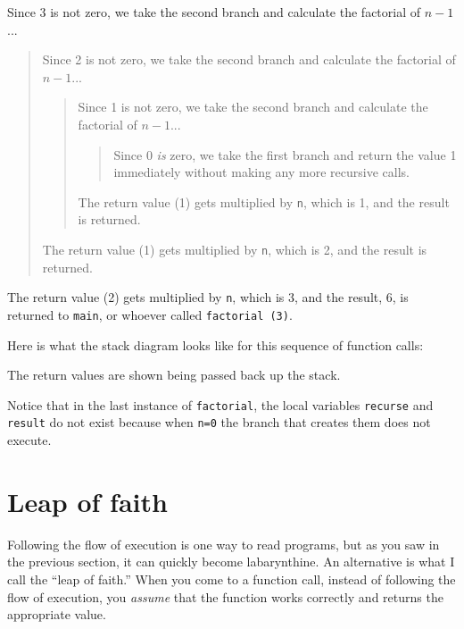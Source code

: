 Since 3 is not zero, we take the second branch and calculate
the factorial of $n-1$...

\begin{quote}
Since 2 is not zero, we take the second branch and calculate
the factorial of $n-1$...

\begin{quote}
Since 1 is not zero, we take the second branch and calculate
the factorial of $n-1$...

\begin{quote}
Since 0 {\em is} zero, we take the first branch and return
the value 1 immediately without making any more recursive
calls.

\end{quote}

The return value (1) gets multiplied by {\tt n}, which is 1,
and the result is returned.

\end{quote}

The return value (1) gets multiplied by {\tt n}, which is 2,
and the result is returned.

\end{quote}

\noindent The return value (2) gets multiplied by {\tt n}, which is 3,
and the result, 6, is returned to {\tt main}, or whoever
called {\tt factorial (3)}.


Here is what the stack diagram looks like for this sequence of
function calls:

\vspace{0.1in}
\centerline{}
\vspace{0.1in}
%
The return values are shown being passed back up the stack.

Notice that in the last instance of {\tt factorial}, the local
variables {\tt recurse} and {\tt result} do not exist because
when {\tt n=0} the branch that creates them does not execute.

\section{Leap of faith}

Following the flow of execution is one way to read programs, but as
you saw in the previous section, it can quickly become labarynthine.
An alternative is what I call the ``leap of faith.''  When you come to
a function call, instead of following the flow of execution, you
{\em assume} that the function works correctly and returns the
appropriate value.

